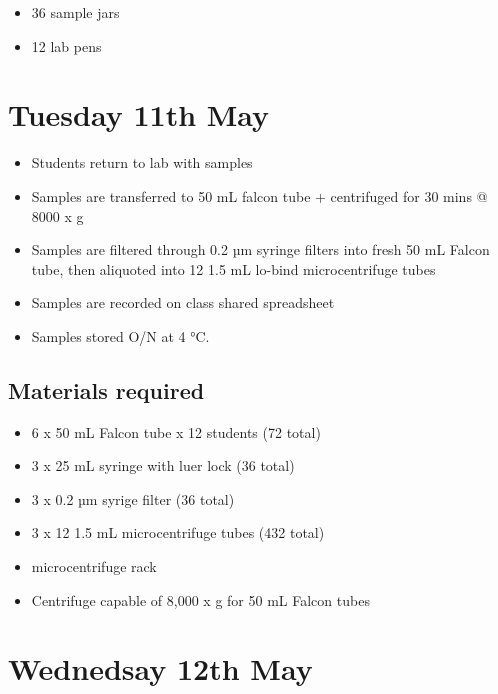 \documentclass[
]{book}
\providecommand{\tightlist}{%
  \setlength{\itemsep}{0pt}\setlength{\parskip}{0pt}}
\begin{document}
\begin{itemize}
\tightlist
\item
  36 sample jars
\item
  12 lab pens
\end{itemize}

\hypertarget{tuesday-11th-may}{%
\section{Tuesday 11th May}\label{tuesday-11th-may}}

\begin{itemize}
\tightlist
\item
  Students return to lab with samples
\item
  Samples are transferred to 50 mL falcon tube + centrifuged for 30 mins @ 8000 x g
\item
  Samples are filtered through 0.2 µm syringe filters into fresh 50 mL Falcon tube, then aliquoted into 12 1.5 mL lo-bind microcentrifuge tubes
\item
  Samples are recorded on class shared spreadsheet
\item
  Samples stored O/N at 4 °C.
\end{itemize}

\hypertarget{materials-required-1}{%
\subsection{Materials required}\label{materials-required-1}}

\begin{itemize}
\tightlist
\item
  6 x 50 mL Falcon tube x 12 students (72 total)
\item
  3 x 25 mL syringe with luer lock (36 total)
\item
  3 x 0.2 µm syrige filter (36 total)
\item
  3 x 12 1.5 mL microcentrifuge tubes (432 total)
\item
  microcentrifuge rack
\item
  Centrifuge capable of 8,000 x g for 50 mL Falcon tubes
\end{itemize}

\hypertarget{wednedsay-12th-may}{%
\section{Wednedsay 12th May}\label{wednedsay-12th-may}}
\end{document}
